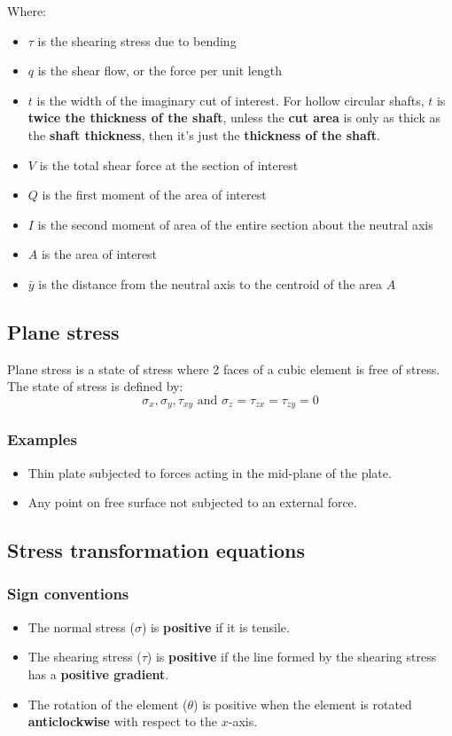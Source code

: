 \documentclass[11pt]{article}
\begin{document}
Where:
\begin{itemize}
\item \(\tau\) is the shearing stress due to bending
\item \(q\) is the shear flow, or the force per unit length
\item \(t\) is the width of the imaginary cut of interest. For hollow circular shafts, \(t\) is \textbf{twice the thickness of the shaft}, unless the \textbf{cut area} is only as thick as the \textbf{shaft thickness}, then it's just the \textbf{thickness of the shaft}.
\item \(V\) is the total shear force at the section of interest
\item \(Q\) is the first moment of the area of interest
\item \(I\) is the second moment of area of the entire section about the neutral axis
\item \(A\) is the area of interest
\item \(\bar{y}\) is the distance from the neutral axis to the centroid of the area \(A\)
\end{itemize}
\subsection{Plane stress}
\label{sec:org1a321b0}
Plane stress is a state of stress where 2 faces of a cubic element is free of stress. The state of stress is defined by:
\[\sigma_x, \sigma_y, \tau_{xy} \text{ and } \sigma_z = \tau_{zx} = \tau_{zy} = 0\]
\subsubsection{Examples}
\label{sec:org431d297}
\begin{itemize}
\item Thin plate subjected to forces acting in the mid-plane of the plate.
\item Any point on free surface not subjected to an external force.
\end{itemize}

\newpage
\subsection{Stress transformation equations}
\label{sec:org9ac148d}

\subsubsection{Sign conventions}
\label{sec:orgea2edf9}
\begin{itemize}
\item The normal stress (\(\sigma\)) is \textbf{positive} if it is tensile.
\item The shearing stress (\(\tau\)) is \textbf{positive} if the line formed by the shearing stress has a \textbf{positive gradient}.
\item The rotation of the element (\(\theta\)) is positive when the element is rotated \textbf{anticlockwise} with respect to the \(x\)-axis.
\end{itemize}
\end{document}
